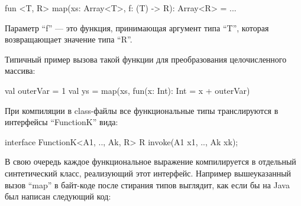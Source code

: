 \begin{pyglist}[language=kotlin]
fun <T, R> map(xs: Array<T>, f: (T) -> R): Array<R> = ...
\end{pyglist}

Параметр ``f'' --- это функция, принимающая аргумент типа ``T'', которая возвращающает значение
типа ``R''.

Типичный пример вызова такой функции для преобразования целочисленного массива:
\begin{pyglist}[language=kotlin]
    val outerVar = 1
    val ys = map(xs, fun(x: Int): Int = x + outerVar)
\end{pyglist}

При компиляции в class-файлы все функциональные типы транслируются в интерфейсы ``FunctionK''
вида:
\begin{pyglist}[language=java]
interface FunctionK<A1, .., Ak, R> {
    R invoke(A1 x1, .., Ak xk);
}
\end{pyglist}

В свою очередь каждое функциональное выражение компилируется в отдельный синтетический класс,
реализующий этот интерфейс. Например вышеуказанный вызов ``map'' в байт-коде после стирания типов
выглядит, как если бы на Java был написан следующий код:

